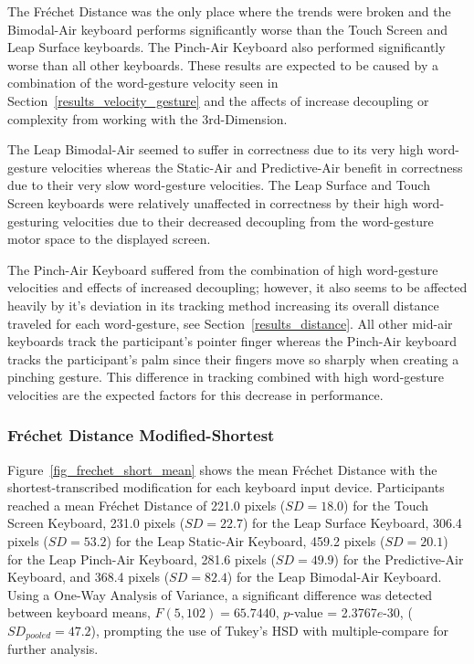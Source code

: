 The Fr\'echet Distance was the only place where the trends were broken and the Bimodal-Air keyboard performs significantly worse than the Touch Screen and Leap Surface keyboards. The Pinch-Air Keyboard also performed significantly worse than all other keyboards. These results are expected to be caused by a combination of the word-gesture velocity seen in Section~\ref{results_velocity_gesture} and the affects of increase decoupling or complexity from working with the 3rd-Dimension.

The Leap Bimodal-Air seemed to suffer in correctness due to its very high word-gesture velocities whereas the Static-Air and Predictive-Air benefit in correctness due to their very slow word-gesture velocities. The Leap Surface and Touch Screen keyboards were relatively unaffected in correctness by their high word-gesturing velocities due to their decreased decoupling from the word-gesture motor space to the displayed screen. 

The Pinch-Air Keyboard suffered from the combination of high word-gesture velocities and effects of increased decoupling; however, it also seems to be affected heavily by it's deviation in its tracking method increasing its overall distance traveled for each word-gesture, see Section~\ref{results_distance}. All other mid-air keyboards track the participant's pointer finger whereas the Pinch-Air keyboard tracks the participant's palm since their fingers move so sharply when creating a pinching gesture. This difference in tracking combined with high word-gesture velocities are the expected factors for this decrease in performance.

\subsubsection{Fr\'echet Distance Modified-Shortest}
Figure~\ref{fig_frechet_short_mean} shows the mean Fr\'echet Distance with the shortest-transcribed modification for each keyboard input device. Participants reached a mean Fr\'echet Distance of 221.0 pixels ($SD = 18.0$) for the Touch Screen Keyboard, 231.0 pixels ($SD = 22.7$) for the Leap Surface Keyboard, 306.4 pixels ($SD = 53.2$) for the Leap Static-Air Keyboard, 459.2 pixels ($SD = 20.1$) for the Leap Pinch-Air Keyboard, 281.6 pixels ($SD = 49.9$) for the Predictive-Air Keyboard, and 368.4 pixels ($SD = 82.4$) for the Leap Bimodal-Air Keyboard. Using a One-Way Analysis of Variance, a significant difference was detected between keyboard means, $F(5, 102) = 65.7440$, $p$-value = 2.3767$e$-30, ($SD_{pooled} = 47.2$), prompting the use of Tukey's HSD with multiple-compare for further analysis.

